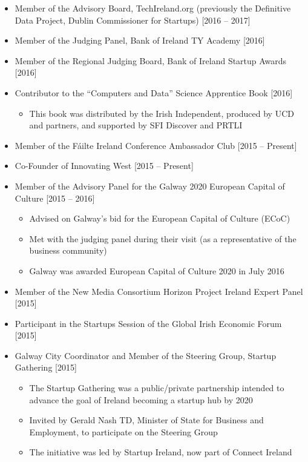 \documentclass[10pt,a4paper]{res} %
\begin{document}
\begin{resume}
\begin{itemize}
\item Member of the Advisory Board, TechIreland.org (previously the Definitive Data Project, Dublin Commissioner for Startups) [2016 -- 2017]
\item Member of the Judging Panel, Bank of Ireland TY Academy [2016]
\item Member of the Regional Judging Board, Bank of Ireland Startup Awards [2016]
\item Contributor to the ``Computers and Data'' Science Apprentice Book [2016]
\begin{itemize} \itemsep -2pt
\item This book was distributed by the Irish Independent, produced by UCD and partners, and supported by SFI Discover and PRTLI
\end{itemize}
\item Member of the F\'{a}ilte Ireland Conference Ambassador Club [2015 -- Present]
\item Co-Founder of Innovating West [2015 -- Present]
\item Member of the Advisory Panel for the Galway 2020 European Capital of Culture [2015 -- 2016]
\begin{itemize} \itemsep -2pt
\item Advised on Galway's bid for the European Capital of Culture (ECoC)
\item Met with the judging panel during their visit (as a representative of the business community)
\item Galway was awarded European Capital of Culture 2020 in July 2016
\end{itemize}
\item Member of the New Media Consortium Horizon Project Ireland Expert Panel [2015]
\item Participant in the Startups Session of the Global Irish Economic Forum [2015]
\item Galway City Coordinator and Member of the Steering Group, Startup Gathering [2015]
\begin{itemize} \itemsep -2pt
\item The Startup Gathering was a public/private partnership intended to advance the goal of Ireland becoming a startup hub by 2020
\item Invited by Gerald Nash TD, Minister of State for Business and Employment, to participate on the Steering Group
\item The initiative was led by Startup Ireland, now part of Connect Ireland
\end{itemize}

\end{itemize}
\end{resume}
\end{document}
